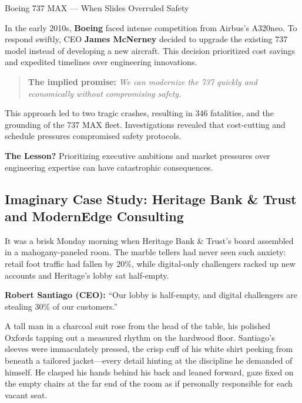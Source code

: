 \begin{HistoricalSidebar}{Boeing 737 MAX — When Slides Overruled Safety}

In the early 2010s, \textbf{Boeing} faced intense competition from Airbus's A320neo. To respond swiftly, CEO \textbf{James McNerney} decided to upgrade the existing 737 model instead of developing a new aircraft. This decision prioritized cost savings and expedited timelines over engineering innovations.

\medskip

\begin{quote}
\textbf{The implied promise:} \textit{We can modernize the 737 quickly and economically without compromising safety.}
\end{quote}

\medskip

This approach led to two tragic crashes, resulting in 346 fatalities, and the grounding of the 737 MAX fleet. Investigations revealed that cost-cutting and schedule pressures compromised safety protocols.

\medskip

\textbf{The Lesson?} Prioritizing executive ambitions and market pressures over engineering expertise can have catastrophic consequences.

\end{HistoricalSidebar}


\subsection{Imaginary Case Study: Heritage Bank \& Trust and ModernEdge Consulting}

It was a brisk Monday morning when Heritage Bank \& Trust’s board assembled in a  
mahogany-paneled room. The marble tellers had never seen such anxiety: retail  
foot traffic had fallen by 20\%, while digital-only challengers racked up new  
accounts and Heritage’s lobby sat half-empty.

\textbf{Robert Santiago (CEO):} “Our lobby is half-empty, and digital challengers  
are stealing 30\% of our customers.”

A tall man in a charcoal suit rose from the head of the table, his polished  
Oxfords tapping out a measured rhythm on the hardwood floor. Santiago’s sleeves  
were immaculately pressed, the crisp cuff of his white shirt peeking from  
beneath a tailored jacket—every detail hinting at the discipline he demanded  
of himself. He clasped his hands behind his back and leaned forward, gaze fixed  
on the empty chairs at the far end of the room as if personally responsible  
for each vacant seat.

